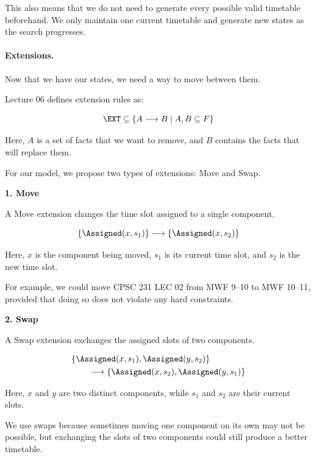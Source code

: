 This also means that we do not need to generate every possible valid timetable beforehand. We only maintain one current timetable and generate new states as the search progresses.

\paragraph{Extensions.}

Now that we have our states, we need a way to move between them.

Lecture 06 defines extension rules as:

\begin{equation}
    \EXT\subseteq
    \{A\longrightarrow B\mid A,B\subseteq F\}
\end{equation}

Here, $A$ is a set of facts that we want to remove, and $B$ contains the facts that will replace them.

For our model, we propose two types of extensions: Move and Swap.

\textbf{1. Move}

A Move extension changes the time slot assigned to a single component.

\begin{equation}
    \{\Assigned(x,s_1)\}
    \longrightarrow
    \{\Assigned(x,s_2)\}
\end{equation}

Here, $x$ is the component being moved, $s_1$ is its current time slot, and $s_2$ is the new time slot.

For example, we could move CPSC 231 LEC 02 from MWF 9--10 to MWF 10--11, provided that doing so does not violate any hard constraints.

\textbf{2. Swap}

A Swap extension exchanges the assigned slots of two components.

\begin{equation}
    \begin{aligned}
    &\{\Assigned(x,s_1),\Assigned(y,s_2)\}\\
    &\qquad\longrightarrow
    \{\Assigned(x,s_2),\Assigned(y,s_1)\}
    \end{aligned}
\end{equation}

Here, $x$ and $y$ are two distinct components, while $s_1$ and $s_2$ are their current slots.

We use swaps because sometimes moving one component on its own may not be possible, but exchanging the slots of two components could still produce a better timetable.

